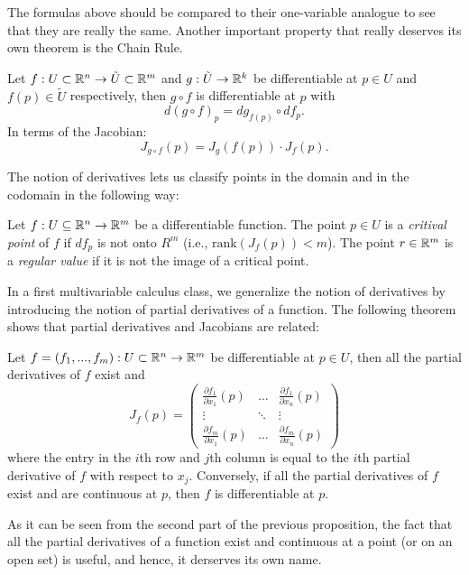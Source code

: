 The formulas above should be compared to their one-variable analogue to see that they are really the same. Another important property that really deserves its own theorem is the Chain Rule.

\begin{theorem}
    Let $f: U \subset \mathbb{R}^n \to \tilde{U} \subset \mathbb{R}^m$ and $g: \tilde{U} \to \mathbb{R}^k$ be differentiable at $p \in U$ and $f(p) \in \tilde{U}$ respectively, then $g\circ f$ is differentiable at $p$ with
    $$d(g\circ f)_p = dg_{f(p)} \circ df_p.$$
    In terms of the Jacobian:
    $$J_{g\circ f}(p) = J_g(f(p)) \cdot J_f(p).$$
\end{theorem}

The notion of derivatives lets us classify points in the domain and in the codomain in the following way:

\begin{definition}
    Let $f : U \subseteq \mathbb{R}^n \to \mathbb{R}^m$ be a differentiable function. The point $p \in U$ is a \textit{critival point} of $f$ if $df_p$ is not onto $R^m$ (i.e., $\text{rank}(J_f(p)) < m$). The point $r \in \mathbb{R}^m$ is a \textit{regular value} if it is not the image of a critical point.
\end{definition}

In a first multivariable calculus class, we generalize the notion of derivatives by introducing the notion of partial derivatives of a function. The following theorem shows that partial derivatives and Jacobians are related:

\begin{proposition}
    Let $f = (f_1, ..., f_m) : U \subset \mathbb{R}^n \to \mathbb{R}^m$ be differentiable at $p \in U$, then all the partial derivatives of $f$ exist and
    $$J_f(p) = \begin{pmatrix}
        \frac{\partial f_1}{\partial x_1}(p) & \dots & \frac{\partial f_1}{\partial x_n}(p) \\ \vdots & \ddots & \vdots \\ \frac{\partial f_m}{\partial x_1}(p) & \dots & \frac{\partial f_m}{\partial x_n}(p)
    \end{pmatrix}$$
    where the entry in the $i$th row and $j$th column is equal to the $i$th partial derivative of $f$ with respect to $x_j$. Conversely, if all the partial derivatives of $f$ exist and are continuous at $p$, then $f$ is differentiable at $p$.
\end{proposition}

As it can be seen from the second part of the previous proposition, the fact that all the partial derivatives of a function exist and continuous at a point (or on an open set) is useful, and hence, it derserves its own name.


